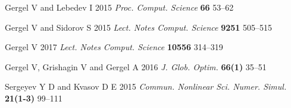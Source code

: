 \documentclass[a4paper]{jpconf}
\begin{document}
\begin{thebibliography}{9}
Gergel V and Lebedev I 2015 \textit{Proc. Comput. Science} \textbf{66} 53--62

Gergel V and Sidorov S 2015 \textit{Lect. Notes Comput. Science} \textbf{9251} 505--515

Gergel V 2017 \textit{Lect. Notes Comput. Science} \textbf{10556} 314--319

Gergel V, Grishagin V and Gergel A 2016 \textit{J. Glob. Optim.} \textbf{66(1)} 35--51

Sergeyev Y D and Kvasov D E 2015 \textit{Commun. Nonlinear Sci. Numer. Simul.} \textbf{21(1-3)} 99--111

\end{thebibliography}
\end{document}
